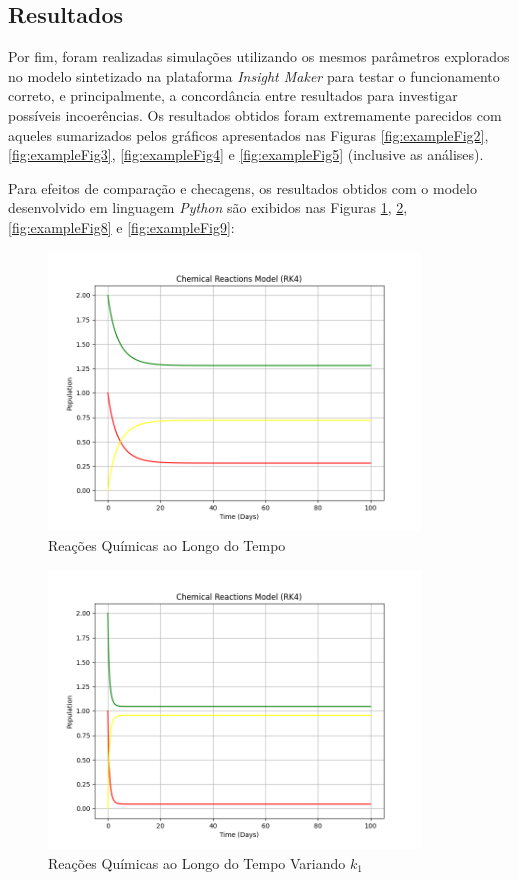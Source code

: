 \documentclass[a4paper, 12pt]{article}
\begin{document}
\subsection*{Resultados}

Por fim, foram realizadas simulações utilizando os mesmos parâmetros explorados no modelo sintetizado na plataforma \emph{Insight Maker} para testar o funcionamento correto, e principalmente, a concordância entre resultados para investigar possíveis incoerências. Os resultados obtidos foram extremamente parecidos com aqueles sumarizados pelos gráficos apresentados nas Figuras \ref{fig:exampleFig2}, \ref{fig:exampleFig3}, \ref{fig:exampleFig4} e \ref{fig:exampleFig5} (inclusive as análises).

Para efeitos de comparação e checagens, os resultados obtidos com o modelo desenvolvido em linguagem \emph{Python} são exibidos nas Figuras \ref{fig:exampleFig6}, \ref{fig:exampleFig7}, \ref{fig:exampleFig8} e \ref{fig:exampleFig9}:

\begin{figure}[H]
    \centering
    \includegraphics[width=0.88\textwidth]{Images/Exercise 2/vanilla.png}
    \caption{Reações Químicas ao Longo do Tempo}
    \label{fig:exampleFig6}
\end{figure}

\begin{figure}[H]
    \centering
    \includegraphics[width=0.88\textwidth]{Images/Exercise 2/k1.png}
    \caption{Reações Químicas ao Longo do Tempo Variando \(k_1\)}
    \label{fig:exampleFig7}
\end{figure}
\end{document}
